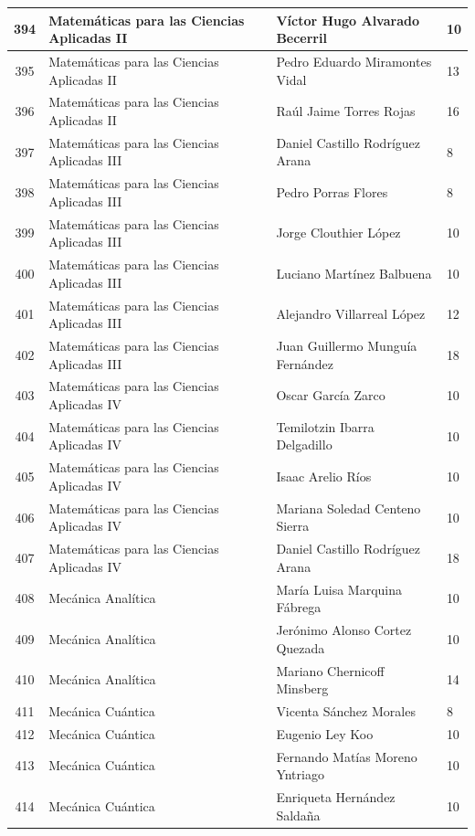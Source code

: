 {\begin{longtable}{|c|p{6.5cm}|p{5cm}|p{1.5cm}|}
  394 & Matemáticas para las Ciencias Aplicadas II & Víctor Hugo Alvarado Becerril & 10 \\ \hline
  395 & Matemáticas para las Ciencias Aplicadas II & Pedro Eduardo Miramontes Vidal & 13 \\ \hline
  396 & Matemáticas para las Ciencias Aplicadas II & Raúl Jaime Torres Rojas & 16 \\ \hline
  397 & Matemáticas para las Ciencias Aplicadas III & Daniel Castillo Rodríguez Arana & 8 \\ \hline
  398 & Matemáticas para las Ciencias Aplicadas III & Pedro Porras Flores & 8 \\ \hline
  399 & Matemáticas para las Ciencias Aplicadas III & Jorge Clouthier López & 10 \\ \hline
  400 & Matemáticas para las Ciencias Aplicadas III & Luciano Martínez Balbuena & 10 \\ \hline
  401 & Matemáticas para las Ciencias Aplicadas III & Alejandro Villarreal López & 12 \\ \hline
  402 & Matemáticas para las Ciencias Aplicadas III & Juan Guillermo Munguía Fernández & 18 \\ \hline
  403 & Matemáticas para las Ciencias Aplicadas IV & Oscar García Zarco & 10 \\ \hline
  404 & Matemáticas para las Ciencias Aplicadas IV & Temilotzin Ibarra Delgadillo & 10 \\ \hline
  405 & Matemáticas para las Ciencias Aplicadas IV & Isaac Arelio Ríos & 10 \\ \hline
  406 & Matemáticas para las Ciencias Aplicadas IV & Mariana Soledad Centeno Sierra & 10 \\ \hline
  407 & Matemáticas para las Ciencias Aplicadas IV & Daniel Castillo Rodríguez Arana & 18 \\ \hline
  408 & Mecánica Analítica & María Luisa Marquina Fábrega & 10 \\ \hline
  409 & Mecánica Analítica & Jerónimo Alonso Cortez Quezada & 10 \\ \hline
  410 & Mecánica Analítica & Mariano Chernicoff Minsberg & 14 \\ \hline
  411 & Mecánica Cuántica & Vicenta Sánchez Morales & 8 \\ \hline
  412 & Mecánica Cuántica & Eugenio Ley Koo & 10 \\ \hline
  413 & Mecánica Cuántica & Fernando Matías Moreno Yntriago & 10 \\ \hline
  414 & Mecánica Cuántica & Enriqueta Hernández Saldaña & 10 \\ \hline

\end{longtable}}
